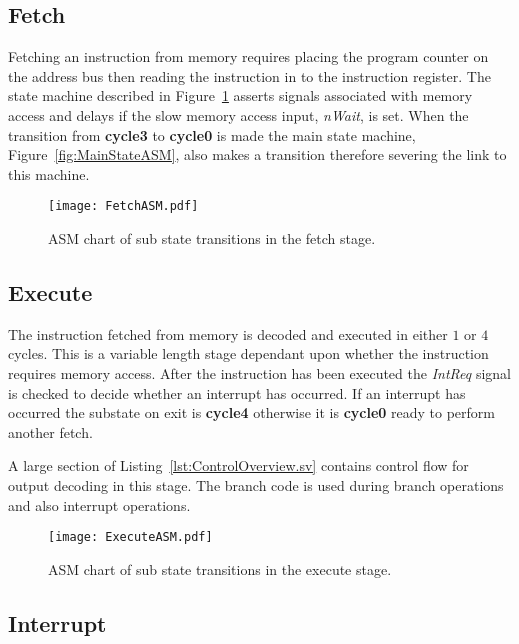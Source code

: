 \subsection{Fetch}

Fetching an instruction from memory requires placing the program counter on the address bus then reading the instruction in to the instruction register. 
The state machine described in Figure~\ref{fig:FetchASM} asserts signals associated with memory access and delays if the slow memory access input, \textit{nWait}, is set.
When the transition from \textbf{cycle3} to \textbf{cycle0} is made the main state machine, Figure~\ref{fig:MainStateASM}, also makes a transition therefore severing the link to this machine. 

\begin{figure}[ht]
   \centering
    \texttt{[image: FetchASM.pdf]}
		\caption{ASM chart of sub state transitions in the fetch stage.}
		\label{fig:FetchASM}
\end{figure}





\subsection{Execute}

The instruction fetched from memory is decoded and executed in either $1$ or $4$ cycles.
This is a variable length stage dependant upon whether the instruction requires memory access.
After the instruction has been executed the \textit{IntReq} signal is checked to decide whether an interrupt has occurred.
If an interrupt has occurred the substate on exit is \textbf{cycle4} otherwise it is \textbf{cycle0} ready to perform another fetch. 

A large section of Listing~\ref{lst:ControlOverview.sv} contains control flow for output decoding in this stage.
The branch code is used during branch operations and also interrupt operations.
\begin{figure}[ht]
   \centering
    \texttt{[image: ExecuteASM.pdf]}
		\caption{ASM chart of sub state transitions in the execute stage.}
		\label{fig:ExecuteASM}
\end{figure}





\subsection{Interrupt}


